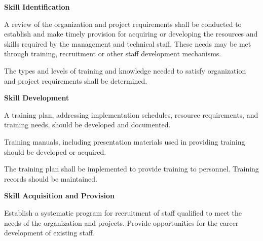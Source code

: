 			\begin{adjustwidth}{2em}{0pt} 

				\begin{compactenum}

					\item {\bf Skill Identification}

					\begin{compactenum}
						
						\item A review of the organization and project requirements shall be conducted to establish and make timely provision for acquiring or developing the resources and skills required by the management and technical staff. These needs may be met through training, recruitment or other staff development mechanisms.
						
						\item The types and levels of training and knowledge needed to satisfy organization and project requirements shall be determined.

					\end{compactenum}

					\item {\bf Skill Development}

					\begin{compactenum}
						
						\item A training plan, addressing implementation schedules, resource requirements, and training needs, should be developed and documented.

						\item Training manuals, including presentation materials used in providing training should be developed or acquired.
						
						\item The training plan shall be implemented to provide training to personnel. Training records should be maintained.

					\end{compactenum}

					\item {\bf Skill Acquisition and Provision}

					\begin{compactenum}
						
						\item Establish a systematic program for recruitment of staff qualified to meet the needs of the organization and projects. Provide opportunities for the career development of existing staff.


\end{compactenum}
\end{compactenum}
\end{adjustwidth}
